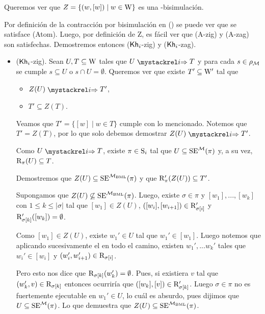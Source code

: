 \begin{demostracion}
    Queremos ver que $Z = \{(w,[w]) \mid w \in \W\}$ es una \KHilogic-bisimulación.
    
    Por definición de la contracción por bisimulación en (\bml) se puede ver que se satisface (Atom). 
    Luego, por definición de Z, es fácil ver que (A-zig) y (A-zag) son satisfechas. Demostremos entonces ($\khi$-zig) y ($\khi$-zag).

    \begin{itemize}
        \item ($\khi$-zig). Sean $U, T \subseteq \W$ tales que $U \ultsExecAgi T$ y para cada $s \in \rho_\model$ se cumple 
        $s \subseteq U$ o $s \cap U = \emptyset$. Queremos ver que existe $T' \subseteq \W'$ tal que

        \begin{multicols}{2}
            \begin{itemize}
                \item $Z(U) \ultsExecAgi T'$, 
                \item $T' \subseteq Z(T)$.
            \end{itemize}
        \end{multicols}
        Veamos que $T' = \{[w] \mid w \in T\}$ cumple con lo mencionado. Notemos que $T' = Z(T)$, por lo que solo debemos demostrar 
        $Z(U) \ultsExecAgi T'$.

        Como $U \ultsExecAgi T$, existe $\pi \in \S_i$ tal que $U \subseteq \sexec^{\model}(\pi)$ y, a su vez, $\R_\pi(U) \subseteq T$.

        Demostremos que $Z(U) \subseteq \sexec^{\model_\bml}(\pi)$ y que $\R'_\pi(Z(U)) \subseteq T'$.

        Supongamos que $Z(U) \not\subseteq\sexec^{\model_\bml}(\pi)$. Luego, existe $\sigma \in \pi$ y $[w_1],...,[w_k]$ 
        con $1 \le k \le |\sigma|$ tal que $[w_1] \in Z(U)$, $([w_i], [w_{i+1}]) \in \R'_{\sigma[i]}$ y 
        $\R'_{\sigma[k]}([w_k]) = \emptyset$.

        Como $[w_1] \in Z(U)$, existe $w_1' \in U$ tal que $w_1' \in [w_1]$. Luego notemos que aplicando sucesivamente el 
         en todo el camino, existen $w_1',...w_k'$ tales que $w_i' \in [w_i]$ y 
        $(w_i',w_{i+1}') \in \R_{\sigma[i]}$.

        Pero esto nos dice que $\R_{\sigma[k]}(w_k') = \emptyset$. Pues, si existiera $v$ tal que 
        $(w_k',v) \in \R_{\sigma[k]}$ entonces ocurriría que $([w_k],[v]) \in \R'_{\sigma[k]}$. Luego $\sigma \in \pi$ no es 
        fuertemente ejecutable en $w_1' \in U$, lo cuál es absurdo, pues dijimos que $U \subseteq \sexec^{\model}(\pi)$. Lo que 
        demuestra que $Z(U) \subseteq \sexec^{\model_\bml}(\pi)$.


\end{itemize}
\end{demostracion}
